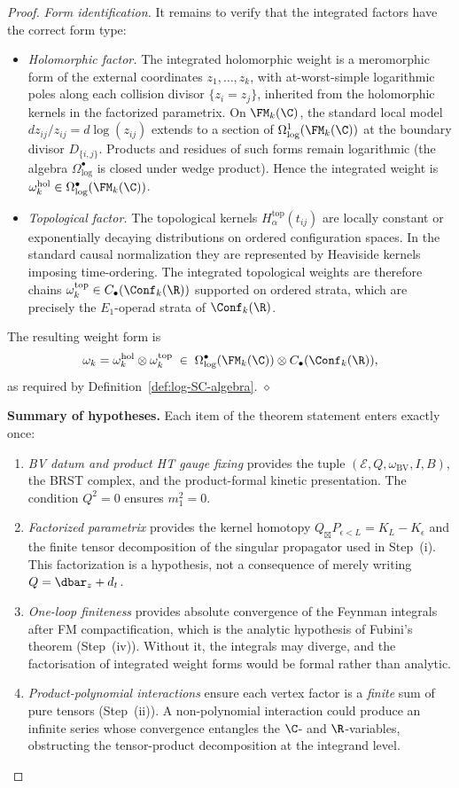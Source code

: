 \begin{proof}
\emph{Form identification.} It remains to verify that the integrated factors have the correct form type:
\begin{itemize}
\item \emph{Holomorphic factor.} The integrated holomorphic weight is a meromorphic form of the external coordinates $z_1, \ldots, z_k$, with at-worst-simple logarithmic poles along each collision divisor $\{z_i = z_j\}$, inherited from the holomorphic kernels in the factorized parametrix. On $\FM_k(\C)$, the standard local model $dz_{ij}/z_{ij} = d\log(z_{ij})$ extends to a section of $\Omega^1_{\log}(\FM_k(\C))$ at the boundary divisor $D_{\{i,j\}}$. Products and residues of such forms remain logarithmic (the algebra $\Omega^\bullet_{\log}$ is closed under wedge product). Hence the integrated weight is $\omega_k^{\mathrm{hol}} \in \Omega^\bullet_{\log}(\FM_k(\C))$.

\item \emph{Topological factor.} The topological kernels
$H_{\alpha}^{\mathrm{top}}(t_{ij})$ are locally constant or
exponentially decaying distributions on ordered configuration
spaces. In the standard causal normalization they are represented by
Heaviside kernels imposing time-ordering. The integrated topological
weights are therefore chains
$\omega_k^{\mathrm{top}} \in C_\bullet(\Conf_k(\R))$ supported on
ordered strata, which are precisely the $E_1$-operad strata of
$\Conf_k(\R)$.
\end{itemize}
The resulting weight form is
\[
 \omega_k = \omega_k^{\mathrm{hol}} \otimes \omega_k^{\mathrm{top}}
 \;\in\;
 \Omega^\bullet_{\log}(\FM_k(\C)) \otimes C_\bullet(\Conf_k(\R)),
\]
as required by Definition~\ref{def:log-SC-algebra}. \hfill$\diamond$

\medskip
\noindent\textbf{Summary of hypotheses.}
Each item of the theorem statement enters exactly once:
\begin{enumerate}[label=(\alph*)]
\item \emph{BV datum and product HT gauge fixing} provides the tuple
$(\mathcal E,Q,\omega_{\mathrm{BV}},I,B)$, the BRST complex, and the
product-formal kinetic presentation. The condition $Q^2=0$ ensures
$m_1^2=0$.
\item \emph{Factorized parametrix} provides the kernel homotopy
$Q_{\boxtimes}P_{\epsilon<L}=K_L-K_\epsilon$ and the finite tensor
decomposition of the singular propagator used in Step~(i). This
factorization is a hypothesis, not a consequence of merely writing
$Q=\dbar_z+d_t$.
\item \emph{One-loop finiteness} provides absolute convergence of
the Feynman integrals after FM compactification, which is the
analytic hypothesis of Fubini's theorem (Step~(iv)). Without it, the
integrals may diverge, and the factorisation of integrated weight
forms would be formal rather than analytic.
\item \emph{Product-polynomial interactions} ensure each vertex
factor is a \emph{finite} sum of pure tensors (Step~(ii)). A
non-polynomial interaction could produce an infinite series whose
convergence entangles the $\C$- and $\R$-variables, obstructing the
tensor-product decomposition at the integrand level.
\end{enumerate}


\end{proof}
